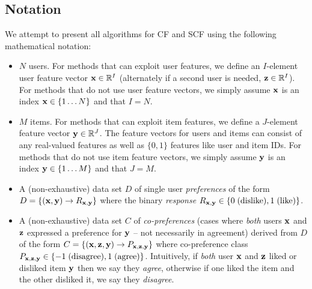 
\subsection{Notation}

\label{sec:notation}

We attempt to present all algorithms for CF and SCF using the following
mathematical notation:
\begin{itemize}
\item $N$ users.  For methods that can exploit user features, we define 
an $I$-element user feature vector 
$\mathbf{x} \in \mathbb{R}^I$ (alternately if a second user is needed, $\mathbf{z} \in \mathbb{R}^I$).
For methods that do not use user feature vectors, we simply assume $\mathbf{x}$
is an index $\mathbf{x} \in \{ 1 \ldots N \}$ and that $I=N$.

\item $M$ items.  For methods that can exploit item features, we define
a $J$-element feature vector 
$\mathbf{y} \in \mathbb{R}^J$. The feature vectors for users 
and items can consist of any real-valued features as well as $\{0,1\}$
features like user and item IDs.
For methods that do not use item feature vectors, we simply assume $\mathbf{y}$
is an index $\mathbf{y} \in \{ 1 \ldots M \}$ and that $J=M$.

\item A (non-exhaustive) data set $D$ of single user \emph{preferences} of the form
$D = \{ (\mathbf{x}, \mathbf{y}) \to R_{\mathbf{x},\mathbf{y}} \}$ where 
the binary \emph{response} 
$R_{\mathbf{x},\mathbf{y}} \in \{ 0 \; \mbox{(dislike)}, 1 \; \mbox{(like)} \}$.

\item A (non-exhaustive) data set $C$ of \emph{co-preferences} (cases where
\emph{both} users $\mathbf{x}$ and $\mathbf{z}$ expressed a preference for $\mathbf{y}$ -- not
necessarily in agreement) derived from $D$ of the form
$C = \{ (\mathbf{x}, \mathbf{z}, \mathbf{y}) \to P_{\mathbf{x}, \mathbf{z}, \mathbf{y}} \}$ where co-preference class 
$P_{\mathbf{x}, \mathbf{z}, \mathbf{y}} \in \{ -1 \; \mbox{(disagree)}, 1 \;\mbox{(agree)} \}$.  
Intuitively, if \emph{both} user $\mathbf{x}$ and $\mathbf{z}$ liked or disliked item 
$\mathbf{y}$ then we say they \emph{agree}, otherwise if one liked the item and
the other disliked it, we say they \emph{disagree}.


\end{itemize}
